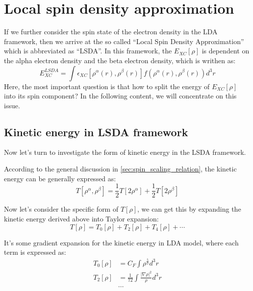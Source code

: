 \section{Local spin density approximation}
\label{sec:LSDA_in_functional}
%
%
%
%
If we further consider the spin state of the electron density in the
LDA framework, then we arrive at the so called ``Local Spin Density
Approximation'' which is abbreviated as ``LSDA''. In this framework,
the $E_{XC}[\rho]$ is dependent on the alpha electron density and
the beta electron density, which is writhen as:
\begin{equation}
  \label{eq:FIDFTeq:21}
E^{LSDA}_{XC} = \int \epsilon_{XC}[\rho^{\alpha}(r),
\rho^{\beta}(r)]f(\rho^{\alpha}(r), \rho^{\beta}(r))d^{3}r
\end{equation}
Here, the most important question is that how to split the energy of
$E_{XC}[\rho]$ into its spin component? In the following content, we
will concentrate on this issue.

\subsection{Kinetic energy in LSDA framework}
\label{sec:KE_in_functional}
%
%
%
%
Now let's turn to investigate the form of kinetic energy in the LSDA
framework.

According to the general discussion in
\ref{sec:spin_scaling_relation}, the kinetic energy can be generally
expressed as:
\begin{equation}\label{eq:FIDFTeq:85}
T[\rho^{\alpha}, \rho^{\beta}] = \frac{1}{2}T[2\rho^{\alpha}] +
\frac{1}{2}T[2\rho^{\beta}]
\end{equation}

Now let's consider the specific form of $T[\rho]$, we can get this by
expanding the kinetic energy derived above into Taylor expansion:
\begin{equation}\label{}
T[\rho] = T_{0}[\rho] + T_{2}[\rho] + T_{4}[\rho] + \cdots
\end{equation}

It's some gradient expansion for the kinetic energy in LDA
model\cite{PhysRevA.20.397}, where each term is expressed as:
\begin{align}\label{}
T_{0}[\rho] &= C_{F}\int \rho^{\frac{5}{3}}d^{3}r \nonumber \\
T_{2}[\rho] &= \frac{1}{72} \int \frac{|\nabla\rho|^{2}}{\rho}
d^{3}r \nonumber \\
&\cdots
\end{align}

